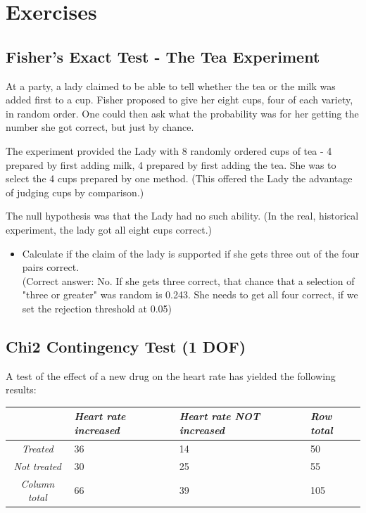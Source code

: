 \section{Exercises}

\subsection*{Fisher's Exact Test - The Tea Experiment}

At a party, a lady claimed to be able to tell whether the tea or the milk was added first to a cup. Fisher proposed to give her eight cups, four of each variety, in random order. One could then ask what the probability was for her getting the number she got correct, but just by chance.

The experiment provided the Lady with 8 randomly ordered cups of tea - 4 prepared by first adding milk, 4 prepared by first adding the tea. She was to select the 4 cups prepared by one method. (This offered the Lady the advantage of judging cups by comparison.)

The null hypothesis was that the Lady had no such ability. (In the real, historical experiment, the lady got all eight cups correct.)

\begin{itemize}
  \item Calculate if the claim of the lady is supported if she gets three out of the four pairs correct.\\
  (Correct answer: No. If she gets three correct, that chance that a selection of "three or greater" was random is 0.243. She needs to get all four correct, if we set the rejection threshold at 0.05)

\end{itemize}


\subsection*{Chi2 Contingency Test (1 DOF)}

A test of the effect of a new drug on the heart rate has yielded the following results:

\begin{table}[h]
  \centering
  \begin{tabular}{|c|l l | l|}
  \hline
  & \emph{Heart rate increased} & \emph{Heart rate NOT increased} & \emph{Row total} \\
  \hline
  \emph{Treated} & 36 & 14 & 50 \\
  \emph{Not treated} & 30 & 25 & 55 \\
  \hline
  \emph{Column total} & 66 & 39 & 105 \\
  \hline
  \end{tabular}
\end{table}

